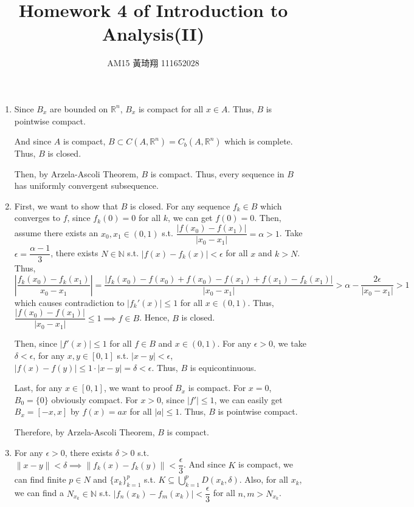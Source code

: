 \documentclass[12pt]{article}
\title{Homework 4 of Introduction to Analysis(II)}
\author{AM15 黃琦翔 111652028}
\begin{document}
\maketitle
\begin{enumerate}
    \item Since $B_x$ are bounded on $\mathbb{R}^n$, $B_x$ is compact for all $x\in A$.
    Thus, $B$ is pointwise compact.

    And since $A$ is compact, $B \subset C(A, \mathbb{R}^n) = C_b(A, \mathbb{R}^n)$ which is complete.
    Thus, $B$ is closed.

    Then, by Arzela-Ascoli Theorem, $B$ is compact.
    Thus, every sequence in $B$ has uniformly convergent subsequence.

    \item First, we want to show that $B$ is closed.
    For any sequence $f_k \in B$ which converges to $f$, 
    since $f_k(0) = 0$ for all $k$, we can get $f(0) = 0$.
    Then, assume there exists an $x_0, x_1 \in (0, 1)$ s.t. $\dfrac{|f(x_0) - f(x_1)|}{|x_0 - x_1|} = \alpha > 1$.
    Take $\epsilon = \dfrac{\alpha-1}{3}$, there exists $N \in \mathbb{N}$ s.t. $|f(x) - f_k(x)| < \epsilon$ for all $x$ and $k > N$.
    Thus, $|\dfrac{f_k(x_0) - f_k(x_1)}{x_0 - x_1}| = \dfrac{|f_k(x_0) - f(x_0) + f(x_0) - f(x_1) + f(x_1) - f_k(x_1)|}{|x_0 - x_1|} > \alpha - \dfrac{2\epsilon}{|x_0 - x_1|} > 1$ 
    which causes contradiction to $|f_k'(x)| \leq 1$ for all $x\in (0, 1)$.
    Thus, $\dfrac{|f(x_0) - f(x_1)|}{|x_0 - x_1|} \leq 1\implies f\in B$.
    Hence, $B$ is closed.
    
    Then, since $|f'(x)| \leq 1$ for all $f\in B$ and $x\in (0, 1)$.
    For any $\epsilon > 0$, we take $\delta < \epsilon$,
    for any $x, y \in [0, 1]$ s.t. $|x - y| < \epsilon$, 
    $|f(x) - f(y)| \leq 1 \cdot |x-y| = \delta < \epsilon$.
    Thus, $B$ is equicontinuous.

    Last, for any $x \in [0, 1]$, we want to proof $B_x$ is compact.
    For $x = 0$, $B_0 = \{ 0\}$ obviously compact.
    For $x > 0$, since $|f'|\leq 1$, we can easily get $B_x = [-x, x]$ by $f(x) = ax$ for all $|a| \leq 1$.
    Thus, $B$ is pointwise compact.

    Therefore, by Arzela-Ascoli Theorem, $B$ is compact.
    
    \newpage
    \item For any $\epsilon > 0$, there exists $\delta > 0$ s.t. $\| x-y\| < \delta \implies \| f_k(x) - f_k(y)\| < \dfrac{\epsilon}{3}$.
    And since $K$ is compact, we can find finite $p\in N$ and $\{ x_k\}_{k=1}^p$ s.t. $K \subseteq \displaystyle\bigcup_{k=1}^p D(x_k, \delta)$.
    Also, for all $x_k$, we can find a $N_{x_k}\in \mathbb{N}$ s.t. $|f_n(x_k) - f_m(x_k)| < \dfrac{\epsilon}{3}$ for all $n, m > N_{x_k}$.


\end{enumerate}
\end{document}
